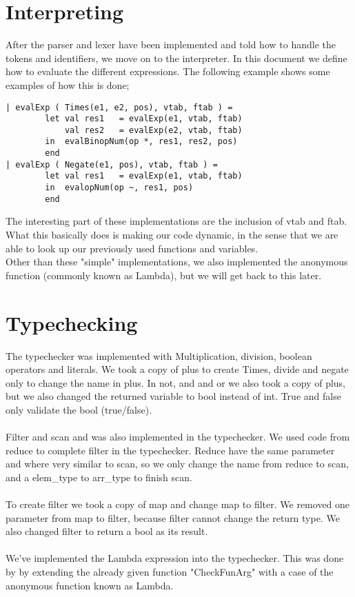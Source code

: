 \documentclass[12pt]{article}
\begin{document}
\section{Interpreting}
After the parser and lexer have been implemented and told how to handle the tokens and identifiers, we move on to the interpreter. In this document we define how to evaluate the different expressions. The following example shows some examples of how this is done;\\
\begin{verbatim}
| evalExp ( Times(e1, e2, pos), vtab, ftab ) =
        let val res1   = evalExp(e1, vtab, ftab)
            val res2   = evalExp(e2, vtab, ftab)
        in  evalBinopNum(op *, res1, res2, pos)
        end
| evalExp ( Negate(e1, pos), vtab, ftab ) =
        let val res1   = evalExp(e1, vtab, ftab)
        in  evalopNum(op ~, res1, pos)
        end
\end{verbatim}
The interesting part of these implementations are the inclusion of vtab and ftab. What this basically does is making our code dynamic, in the sense that we are able to look up our previously used functions and variables.\\
Other than these "simple" implementations, we also implemented the anonymous function (commonly known as Lambda), but we will get back to this later.
\section{Typechecking}
The typechecker was implemented with Multiplication, division, boolean operators and literals. We took a copy of plus to create Times, divide and negate only to change the name in plus. In not, and and or we also took a copy of plus, but we also changed the returned variable to bool instead of int. True and false only validate the bool (true/false).
\\\\
Filter and scan and was also implemented in the typechecker. We used code from reduce to complete filter in the typechecker. Reduce have the same parameter and where very similar to scan, so we only change the name from reduce to scan, and a elem\_type to arr\_type to finish scan.
\\\\
To create filter we took a copy of map and change map to filter. We removed one parameter from map to filter, because filter cannot change the return type. We also changed filter to return a bool as its result.
\\\\
We've implemented the Lambda expression into the typechecker. This was done by by extending the already given function "CheckFunArg" with a case of the anonymous function known as Lambda.
\end{document}
